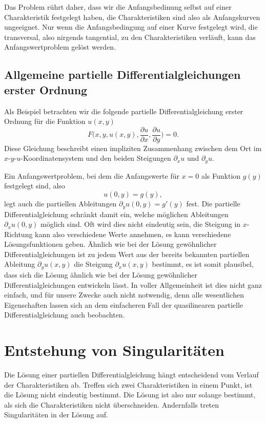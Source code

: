 Das Problem rührt daher, dass wir die Anfangsbedinung selbst auf einer
Charakteristik festgelegt haben, die Charakteristiken sind also als
Anfangskurven ungeeignet. Nur wenn die Anfangsbedingung auf einer Kurve
festgelegt wird, die transversal, also nirgends tangential, zu den
Charakteristiken verläuft, kann das Anfangswertproblem gelöst werden.

\subsection{Allgemeine partielle Differentialgleichungen erster Ordnung}
Als Beispiel betrachten wir die folgende partielle Differentialgleichung
erster Ordnung für die Funktion $u(x,y)$
\begin{equation}
F\biggl(
x,y,u(x,y),\frac{\partial u}{\partial x},\frac{\partial u}{\partial y}
\biggr)=0.
\end{equation}
Diese Gleichung beschreibt einen impliziten Zusammenhang zwischen
dem Ort im $x$-$y$-$u$-Ko\-or\-di\-na\-ten\-sys\-tem und den beiden Steigungen
$\partial_xu$ und $\partial_yu$.

Ein Anfangswertproblem, bei dem die Anfangswerte für $x=0$ als
Funktion $g(y)$ festgelegt sind, also
\[
u(0,y)=g(y),
\]
legt auch die
partiellen Ableitungen $\partial_y u(0,y)=g'(y)$ fest.  Die partielle
Differentialgleichung schränkt damit ein, welche möglichen Ableitungen
$\partial_xu(0,y)$ möglich sind. Oft wird dies nicht eindeutig sein,
die Steigung in $x$-Richtung kann also verschiedene Werte annehmen,
es kann verschiedene Lösungsfunktionen geben. Ähnlich wie bei der
Lösung gewöhnlicher Differentialgleichungen ist zu jedem Wert
aus der bereits bekannten partiellen Ableitung $\partial_yu(x,y)$
die Steigung $\partial_xu(x,y)$ bestimmt, es ist somit plausibel, dass
sich die Lösung ähnlich wie bei der Lösung gewöhnlicher Differentialgleichungen
entwickeln lässt. In voller Allgemeinheit ist dies nicht ganz einfach,
und für unsere Zwecke auch nicht notwendig, denn alle wesentlichen
Eigenschaften lassen sich an dem einfacheren Fall der quasilinearen
partielle Differentialgleichung auch beobachten.


\section{Entstehung von Singularitäten}
Die Lösung einer partiellen Differentialgleichung hängt entscheidend
vom Verlauf der Charakteristiken ab. Treffen sich zwei Charakteristiken
in einem Punkt, ist die Lösung nicht eindeutig bestimmt. Die Lösung
ist also nur solange bestimmt, als sich die Charakteristiken nicht überschneiden.
Andernfalls treten Singularitäten in der Lösung auf.

